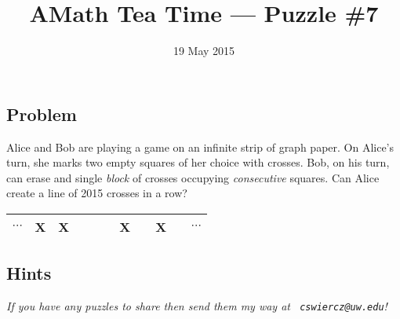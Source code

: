 \documentclass[12pt]{article}
\title{AMath Tea Time --- Puzzle \#7}
\author{}
\date{\vspace{-1cm}19 May 2015}
\begin{document}
\maketitle
{}

\subsection*{Problem}

Alice and Bob are playing a game on an infinite strip of graph paper. On
Alice's turn, she marks two empty squares of her choice with crosses. Bob, on
his turn, can erase and single {\it block} of crosses occupying {\it
  consecutive} squares. Can Alice create a line of 2015 crosses in a row?

\vspace{24pt}

\begin{table}[ht]
  \centering
  \large
  \begin{tabular}{m{16pt}|m{16pt}|m{16pt}|m{16pt}|m{16pt}|m{16pt}|m{16pt}|m{16pt}|m{16pt}|m{16pt}|m{16pt}}
    \hline
    $\cdots$ & X & X &  &  & & X &  & X & & $\cdots$ \\ \hline
  \end{tabular}
\end{table}

\vspace{24pt}

\subsection*{Hints}

{
\par\vspace*{\fill}
\noindent \small \it
If you have any puzzles to share then send them my way at {\tt
  cswiercz@uw.edu}!
}
\end{document}
